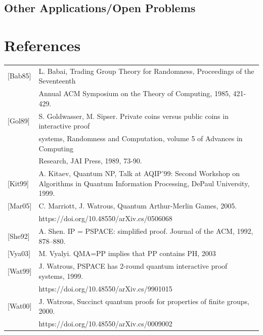 \documentclass[12pt]{article}
\begin{document}
    \subsection{Other Applications/Open Problems}
	
	\newpage	
	\section*{References}
	\begin{tabular}{ l l }
		\label{bab}[Bab85] & L. Babai, Trading Group Theory for Randomness, Proceedings of the Seventeenth\\& Annual ACM
		Symposium on the Theory of Computing, 1985, 421-429.\\
		\label{gol89}[Gol89] & S. Goldwasser, M. Sipser. Private coins versus public coins in interactive proof \\& systems, Randomness and Computation, volume 5 of Advances in Computing\\& Research, JAI Press, 1989, 73-90.\\
		\label{kit99}[Kit99] & A. Kitaev, Quantum NP, Talk at AQIP’99: Second Workshop on Algorithms in Quantum
		Information Processing, DePaul University, 1999.\\
		\label{mar05}[Mar05] & C. Marriott, J. Watrous, Quantum Arthur-Merlin Games, 2005. \\&https://doi.org/10.48550/arXiv.cs/0506068\\
		\label{she92}[She92] & A. Shen. IP = PSPACE: simplified proof. Journal of the ACM, 1992, 878–880.\\
		\label{vya03}[Vya03] & M. Vyalyi. QMA=PP implies that PP contains PH, 2003\\
		\label{wat99}[Wat99] & J. Watrous, PSPACE has 2-round quantum interactive proof systems, 1999. \\&https://doi.org/10.48550/arXiv.cs/9901015\\
		\label{wat00}[Wat00] & J. Watrous, Succinct quantum proofs for properties of finite groups, 2000. \\&https://doi.org/10.48550/arXiv.cs/0009002\\
		
	\end{tabular}
	
		
\end{document}
